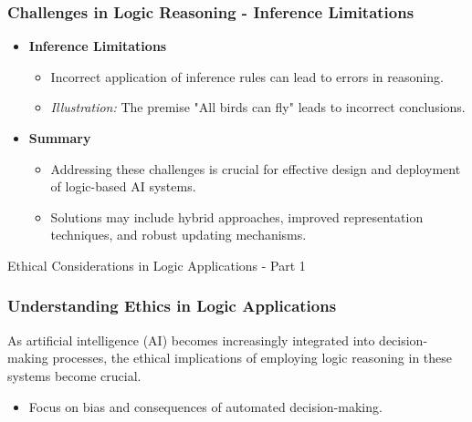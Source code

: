 \documentclass[aspectratio=169]{beamer}
\begin{document}
\begin{frame}[fragile]
    \frametitle{Challenges in Logic Reasoning - Inference Limitations}
    \begin{itemize}
        \item \textbf{Inference Limitations}
            \begin{itemize}
                \item Incorrect application of inference rules can lead to errors in reasoning.
                \item \textit{Illustration:} The premise "All birds can fly" leads to incorrect conclusions.
            \end{itemize}
        \item \textbf{Summary}
            \begin{itemize}
                \item Addressing these challenges is crucial for effective design and deployment of logic-based AI systems.
                \item Solutions may include hybrid approaches, improved representation techniques, and robust updating mechanisms.
            \end{itemize}
    \end{itemize}
\end{frame}

\begin{frame}[fragile]{Ethical Considerations in Logic Applications - Part 1}
    \frametitle{Understanding Ethics in Logic Applications}
    As artificial intelligence (AI) becomes increasingly integrated into decision-making processes, the ethical implications of employing logic reasoning in these systems become crucial. 
    \begin{itemize}
        \item Focus on bias and consequences of automated decision-making.
    \end{itemize}
\end{frame}
\end{document}
